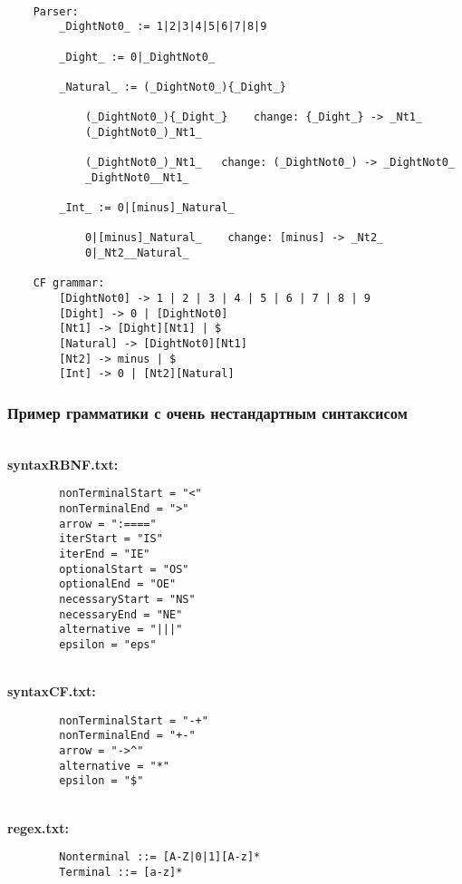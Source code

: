 \documentclass[12pt]{article}
\begin{document}
    \hfill \\
    \begin{lstlisting}
    Parser:
        _DightNot0_ := 1|2|3|4|5|6|7|8|9

        _Dight_ := 0|_DightNot0_

        _Natural_ := (_DightNot0_){_Dight_}

            (_DightNot0_){_Dight_}    change: {_Dight_} -> _Nt1_
            (_DightNot0_)_Nt1_

            (_DightNot0_)_Nt1_   change: (_DightNot0_) -> _DightNot0_
            _DightNot0__Nt1_

        _Int_ := 0|[minus]_Natural_

            0|[minus]_Natural_    change: [minus] -> _Nt2_
            0|_Nt2__Natural_

    CF grammar:
        [DightNot0] -> 1 | 2 | 3 | 4 | 5 | 6 | 7 | 8 | 9
        [Dight] -> 0 | [DightNot0]
        [Nt1] -> [Dight][Nt1] | $
        [Natural] -> [DightNot0][Nt1]
        [Nt2] -> minus | $
        [Int] -> 0 | [Nt2][Natural]
    \end{lstlisting}

    \clearpage


    \subsubsection*{\large Пример грамматики с очень нестандартным синтаксисом}

    \hfill \\
    {\bfseries syntaxRBNF.txt:}
    \begin{lstlisting}
        nonTerminalStart = "<"
        nonTerminalEnd = ">"
        arrow = ":===="
        iterStart = "IS"
        iterEnd = "IE"
        optionalStart = "OS"
        optionalEnd = "OE"
        necessaryStart = "NS"
        necessaryEnd = "NE"
        alternative = "|||"
        epsilon = "eps"
    \end{lstlisting}

    \hfill \\
    {\bfseries syntaxCF.txt:}
    \begin{lstlisting}
        nonTerminalStart = "-+"
        nonTerminalEnd = "+-"
        arrow = "->^"
        alternative = "*"
        epsilon = "$"
    \end{lstlisting}

    \hfill \\
    {\bfseries regex.txt:}
    \begin{lstlisting}
        Nonterminal ::= [A-Z|0|1][A-z]*
        Terminal ::= [a-z]*
    \end{lstlisting}
\end{document}
